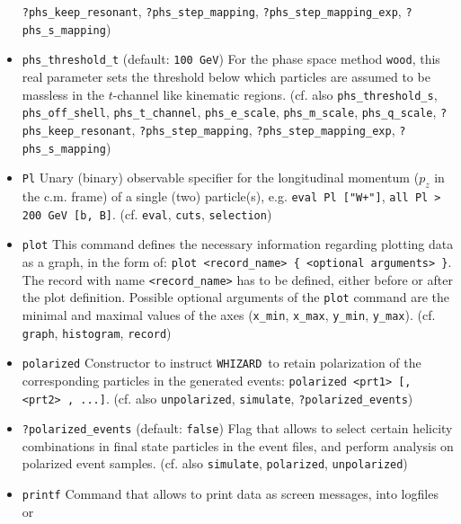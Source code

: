 \documentclass[12pt]{book}
\newcommand{\ttt}[1]{\texttt{#1}}
\newcommand{\whizard}{\texttt{WHIZARD}}
\begin{document}
\begin{itemize}
\ttt{?phs\_keep\_resonant}, \ttt{?phs\_step\_mapping},
\ttt{?phs\_step\_mapping\_exp}, \newline \ttt{?phs\_s\_mapping})
\item
\ttt{phs\_threshold\_t} \qquad (default: \ttt{100 GeV}) \newline
For the phase space method \ttt{wood}, this real parameter sets the
threshold below which particles are assumed to be massless in the
$t$-channel like kinematic regions. (cf. also \ttt{phs\_threshold\_s},
\ttt{phs\_off\_shell}, \ttt{phs\_t\_channel}, \ttt{phs\_e\_scale}, 
\ttt{phs\_m\_scale}, \newline \ttt{phs\_q\_scale},
\ttt{?phs\_keep\_resonant}, \ttt{?phs\_step\_mapping},
\ttt{?phs\_step\_mapping\_exp}, \newline \ttt{?phs\_s\_mapping})
\item
\ttt{Pl} \newline
Unary (binary) observable specifier for the longitudinal momentum
($p_z$ in the c.m. frame) of a single (two) particle(s),
e.g. \ttt{eval Pl ["W+"]}, \ttt{all Pl > 200 GeV [b,
B]}. (cf. \ttt{eval}, \ttt{cuts}, \ttt{selection})
\item
\ttt{plot} \newline
This command defines the necessary information regarding plotting data
as a graph, in the form of: \ttt{plot <record\_name> \{ <optional
arguments> \}}. The record with name \ttt{<record\_name>} has to be
defined, either before or after the plot definition. Possible optional
arguments of the \ttt{plot} command are the minimal and maximal values
of the axes (\ttt{x\_min}, \ttt{x\_max}, \ttt{y\_min}, \ttt{y\_max}). 
(cf. \ttt{graph}, \ttt{histogram}, \ttt{record})
\item
\ttt{polarized} \newline
Constructor to instruct \whizard\ to retain polarization of the
corresponding particles in the generated events: \ttt{polarized <prt1>
  [, <prt2> , ...]}. (cf. also \ttt{unpolarized}, \ttt{simulate},
\ttt{?polarized\_events})
\item
\ttt{?polarized\_events} \qquad (default: \ttt{false}) \newline
Flag that allows to select certain helicity combinations in final
state particles in the event files, and perform analysis on polarized
event samples. (cf. also \ttt{simulate}, \ttt{polarized}, \ttt{unpolarized})
\item
\ttt{printf} \newline
Command that allows to print data as screen messages, into logfiles or

\end{itemize}
\end{document}
